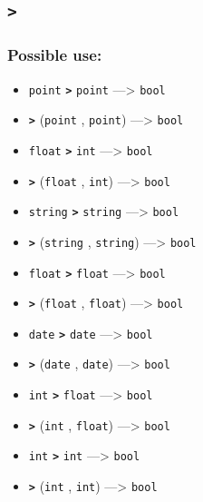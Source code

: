 \documentclass[]{book}
\providecommand{\tightlist}{%
  \setlength{\itemsep}{0pt}\setlength{\parskip}{0pt}}
\theoremstyle{definition}
\theoremstyle{definition}
\theoremstyle{definition}
\theoremstyle{remark}
\begin{document}
\subsection{\texorpdfstring{\texttt{\textgreater{}}}{\textgreater{}}}\label{section-16}

\subsubsection{Possible use:}\label{possible-use-14}

\begin{itemize}
\tightlist
\item
  \texttt{point} \textbf{\texttt{\textgreater{}}} \texttt{point}
  ---\textgreater{} \texttt{bool}
\item
  \textbf{\texttt{\textgreater{}}} (\texttt{point} , \texttt{point})
  ---\textgreater{} \texttt{bool}
\item
  \texttt{float} \textbf{\texttt{\textgreater{}}} \texttt{int}
  ---\textgreater{} \texttt{bool}
\item
  \textbf{\texttt{\textgreater{}}} (\texttt{float} , \texttt{int})
  ---\textgreater{} \texttt{bool}
\item
  \texttt{string} \textbf{\texttt{\textgreater{}}} \texttt{string}
  ---\textgreater{} \texttt{bool}
\item
  \textbf{\texttt{\textgreater{}}} (\texttt{string} , \texttt{string})
  ---\textgreater{} \texttt{bool}
\item
  \texttt{float} \textbf{\texttt{\textgreater{}}} \texttt{float}
  ---\textgreater{} \texttt{bool}
\item
  \textbf{\texttt{\textgreater{}}} (\texttt{float} , \texttt{float})
  ---\textgreater{} \texttt{bool}
\item
  \texttt{date} \textbf{\texttt{\textgreater{}}} \texttt{date}
  ---\textgreater{} \texttt{bool}
\item
  \textbf{\texttt{\textgreater{}}} (\texttt{date} , \texttt{date})
  ---\textgreater{} \texttt{bool}
\item
  \texttt{int} \textbf{\texttt{\textgreater{}}} \texttt{float}
  ---\textgreater{} \texttt{bool}
\item
  \textbf{\texttt{\textgreater{}}} (\texttt{int} , \texttt{float})
  ---\textgreater{} \texttt{bool}
\item
  \texttt{int} \textbf{\texttt{\textgreater{}}} \texttt{int}
  ---\textgreater{} \texttt{bool}
\item
  \textbf{\texttt{\textgreater{}}} (\texttt{int} , \texttt{int})
  ---\textgreater{} \texttt{bool}
\end{itemize}
\end{document}
